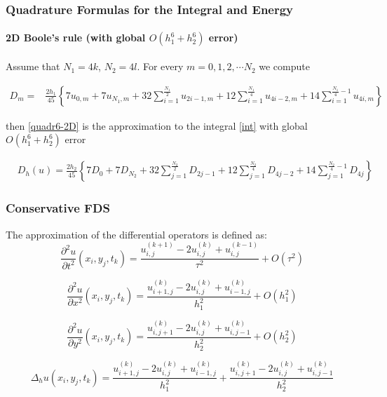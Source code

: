 \documentclass{beamer}
\begin{document}
\begin{frame}
\frametitle{Quadrature Formulas for the Integral and Energy}
\framesubtitle{\textbf{2D Boole's rule} (with global $O(h_1^6+h_2^6)$ error)}

Assume that $N_1=4k$, $N_2=4 l$.
For every $m=0,1,2,\cdots N_2$ we compute

\begin{align*}
D_m =& \frac{2h_1}{45} 
\left\{
7u_{0,m}+7u_{N_1,m}+32 \sum_{i=1}^{\frac{N_1}{2}}u_{2i-1,m}
+12\sum_{i=1}^{\frac{N_1}{4}}u_{4i-2,m}
+14 \sum_{i=1}^{\frac{N_1}{4}-1}u_{4i,m}
\right\}
\end{align*}

then \eqref{quadr6-2D} is the approximation to the integral \eqref{int} with global $O(h_1^6+h_2^6)$ error

\begin{align}\label{quadr6-2D}
&D_h(u) =
\frac{2h_2}{45} 
\left\{
7D_{0}+7D_{N_2}+32 \sum_{j=1}^{\frac{N_2}{2}}D_{2j-1}
+12\sum_{j=1}^{\frac{N_2}{4}}D_{4j-2}
+14 \sum_{j=1}^{\frac{N_2}{4}-1}D_{4j}
\right\}
\end{align}
\end{frame}


\begin{frame}
\frametitle{Conservative FDS}
The approximation of the differential operators is defined as:
\begin{equation}
\frac{\partial^2 u}{\partial t^2}(x_i, y_j, t_k ) = \frac{ u^{(k+1)}_{i, j} - 2u^{(k)}_{i,j} + u^{(k-1)}_{i,j} }{\tau^2} + O(\tau^2) 
\end{equation}

\begin{equation}
\frac{\partial^2 u}{\partial x^2}(x_i, y_j, t_k ) = \frac{ u^{(k)}_{i+1, j} - 2u^{(k)}_{i,j} + u^{(k)}_{i-1,j} }{h_1^2} + O(h_1^2) 
\end{equation}

\begin{equation}
\frac{\partial^2 u}{\partial y^2}(x_i, y_j, t_k ) = \frac{ u^{(k)}_{i, j+1} - 2u^{(k)}_{i,j} + u^{(k)}_{i,j-1} }{h_2^2} + O(h_2^2) 
\end{equation}


\begin{equation}
\Delta_h u(x_i, y_j, t_k )  = \frac{ u^{(k)}_{i+1, j} - 2u^{(k)}_{i,j} + u^{(k)}_{i-1,j} }{h_1^2} + \frac{ u^{(k)}_{i, j+1} - 2u^{(k)}_{i,j} + u^{(k)}_{i,j-1} }{h_2^2}
\end{equation}

\end{frame}
\end{document}

